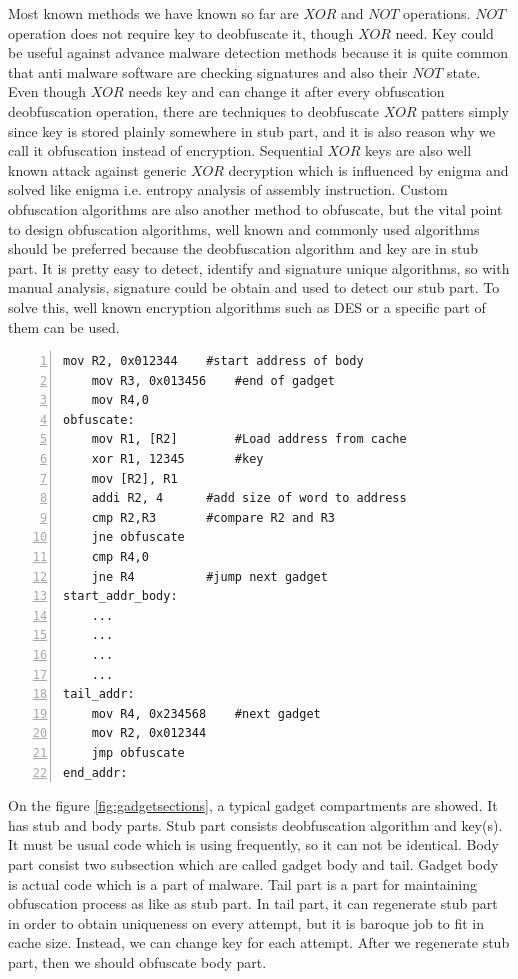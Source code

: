 			Most known methods we have known so far are $XOR$ and $NOT$ operations. $NOT$ operation does not require key to deobfuscate it, though $XOR$ need. Key could be useful against advance malware detection methods because it is quite common that anti malware software are checking signatures and also their $NOT$ state. Even though $XOR$ needs key and can change it after every obfuscation deobfuscation operation, there are techniques to deobfuscate $XOR$ patters simply since key is stored plainly somewhere in stub part, and it is also reason why we call it obfuscation instead of encryption. Sequential $XOR$ keys are also well known attack against generic $XOR$ decryption which is influenced by enigma and solved like enigma i.e. entropy analysis of assembly instruction. Custom obfuscation algorithms are also another method to obfuscate, but the vital point to design obfuscation algorithms, well known and commonly used algorithms should be preferred because the deobfuscation algorithm and key are in stub part. It is pretty easy to detect, identify and signature unique algorithms, so with manual analysis, signature could be obtain and used to detect our stub part. To solve this, well known encryption algorithms such as DES or a specific part of them can be used.
	    \begin{lstlisting}[caption=The code example of obfuscation and deobfuscation routine, label=code:obfuscation, numbers=left, numberstyle=\tiny]
	mov R2, 0x012344 	#start address of body
	mov R3, 0x013456 	#end of gadget
	mov R4,0
obfuscate: 
	mov R1, [R2] 		#Load address from cache
	xor R1, 12345 		#key
	mov [R2], R1
	addi R2, 4 		#add size of word to address
	cmp R2,R3 		#compare R2 and R3
	jne obfuscate
	cmp R4,0
	jne R4 			#jump next gadget
start_addr_body:
	...
	...
	...
	...
tail_addr:
	mov R4, 0x234568 	#next gadget
	mov R2, 0x012344
	jmp obfuscate
end_addr:
		\end{lstlisting}

			On the figure \ref{fig:gadgetsections}, a typical gadget compartments are showed. It has stub and body parts. Stub part consists deobfuscation algorithm and key(s). It must be usual code which is using frequently, so it can not be identical. Body part consist two subsection which are called gadget body and tail. Gadget body is actual code which is a part of malware. Tail part is a part for maintaining obfuscation process as like as stub part. In tail part, it can regenerate stub part in order to obtain uniqueness on every attempt, but it is baroque job to fit in cache size. Instead, we can change key for each attempt. After we regenerate stub part, then we should obfuscate body part. 

